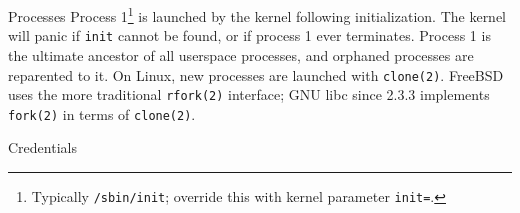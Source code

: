 \documentclass[mathserif,xcolor={dvipsnames,table}]{beamer}
\begin{document}
\begin{frame}{Processes}
Process 1\footnote{\tiny{Typically {\tt /sbin/init}; override this with kernel parameter {\tt init=}.}} is launched by the
kernel following initialization. The kernel will panic if {\tt init} cannot be found,
or if process 1 ever terminates. Process 1 is the ultimate ancestor of all userspace
processes, and orphaned processes are reparented to it.
\vfill
On Linux, new processes are launched with {\tt clone(2)}. FreeBSD uses the more
traditional {\tt rfork(2)} interface; GNU libc since 2.3.3 implements {\tt fork(2)}
in terms of {\tt clone(2)}.
\end{frame}

\begin{frame}{Credentials}

\end{frame}
\end{document}
